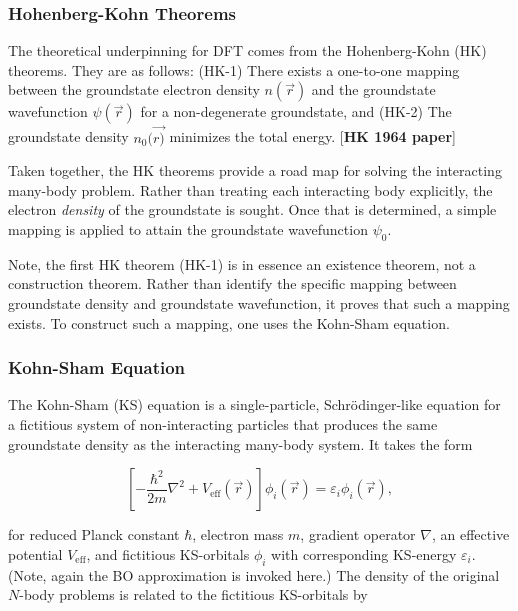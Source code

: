         \subsubsection{Hohenberg-Kohn Theorems} 
        
        The theoretical underpinning for DFT comes from the Hohenberg-Kohn (HK) theorems. They are as follows: (HK-1) There exists a one-to-one mapping between the groundstate electron density $n(\Vec{r})$ and the groundstate wavefunction $\psi (\Vec{r})$ for a non-degenerate groundstate, and (HK-2) The groundstate density $n_0(\Vec{r)}$ minimizes the total energy. [\textbf{HK 1964 paper}]
        
        Taken together, the HK theorems provide a road map for solving the interacting many-body problem. Rather than treating each interacting body explicitly, the electron \textit{density} of the groundstate is sought. Once that is determined, a simple mapping is applied to attain the groundstate wavefunction $\psi_0$.
        
        Note, the first HK theorem (HK-1) is in essence an existence theorem, not a construction theorem. Rather than identify the specific mapping between groundstate density and groundstate wavefunction, it proves that such a mapping exists. To construct such a mapping, one uses the Kohn-Sham equation.
        
        \subsubsection{Kohn-Sham Equation} 
        
        The Kohn-Sham (KS) equation is a single-particle, Schr{\"o}dinger-like equation for a fictitious system of non-interacting particles that produces the same groundstate density as the interacting many-body system. It takes the form
        
        \begin{equation}
            \label{eq:ks}
            \left[-\frac{\hbar^2}{2 m}\nabla^2 + V_\text{eff}(\Vec{r}) \right]\phi_i(\Vec{r}) = \varepsilon_i \phi_i(\Vec{r}),
        \end{equation}
        
        \noindent for reduced Planck constant $\hbar$, electron mass $m$, gradient operator $\nabla$, an effective potential $V_\text{eff}$, and fictitious KS-orbitals $\phi_i$ with corresponding KS-energy $\varepsilon_i$. (Note, again the BO approximation is invoked here.) The density of the original $N$-body problems is related to the fictitious KS-orbitals by
        
